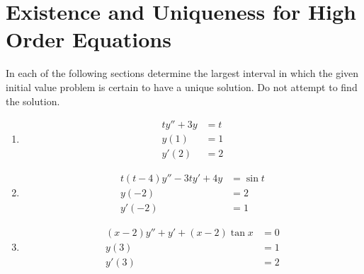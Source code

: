 \documentclass[fleqn, a4paper, 11pt, oneside]{amsart}
\theoremstyle{definition}
\theoremstyle{theorem}
\begin{document}
\part{Existence and Uniqueness for High Order Equations}

\begin{question}
	In each of the following sections determine the largest interval in which the given initial value problem is certain to have a unique solution.
	Do not attempt to find the solution.
	\begin{enumerate}
		\item
			\begin{align*}
				t y'' + 3 y &= t\\
				y(1) &= 1\\
				y'(2) &= 2
			\end{align*}
		\item
			\begin{align*}
				t (t - 4) y'' - 3 t y' + 4 y &= \sin t\\
				y(-2) &= 2\\
				y'(-2) &= 1
			\end{align*}
		\item
			\begin{align*}
				(x - 2) y'' + y' + (x - 2) \tan x &= 0\\
				y(3) &= 1\\
				y'(3) &= 2
			\end{align*}
	\end{enumerate}
\end{question}
\end{document}
